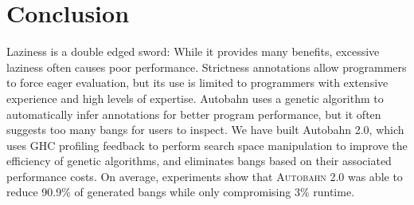 \documentclass[format=sigplan, review=true]{acmart}
\newcommand{\At}[0]{\textsc{Autobahn 2.0}}
\begin{document}
\section{Conclusion}

Laziness is a double edged sword: While it provides many benefits, excessive laziness often causes poor performance. Strictness annotations allow programmers to force eager evaluation, but its use is limited to programmers with extensive experience and high levels of expertise. Autobahn uses a genetic algorithm to automatically infer annotations for better program performance, but it often suggests too many bangs for users to inspect. We have built Autobahn 2.0, which uses GHC profiling feedback to perform search space manipulation to improve the efficiency of genetic algorithms, and eliminates bangs based on their associated performance costs. On average, experiments show that \At{} was able to reduce 90.9\% of generated bangs while only compromising 3\% runtime.
\end{document}

